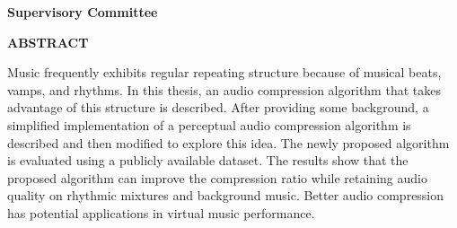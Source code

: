 \newpage
{}

\noindent\textbf{Supervisory Committee}
\tpbreak
\panel

\begin{center}
\textbf{ABSTRACT}
\end{center}

Music frequently exhibits regular repeating structure because of musical beats, vamps, and rhythms. In this thesis, an audio compression 
algorithm that takes advantage of this structure is described. After providing some background, a simplified implementation of a perceptual audio compression algorithm is described and then modified to explore this idea. The newly proposed algorithm is evaluated using a publicly available dataset. The results show that the proposed algorithm can improve the compression ratio while retaining audio quality on rhythmic mixtures and background music. Better audio compression has potential applications in virtual music performance. 